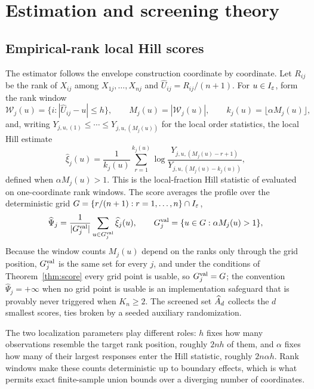 \section{Estimation and screening theory}\label{sec:estimation}

\subsection{Empirical-rank local Hill scores}

The estimator follows the envelope construction coordinate by coordinate.
Let $R_{ij}$ be the rank of $X_{ij}$ among $X_{1j},\ldots,X_{nj}$ and
$\widehat U_{ij}=R_{ij}/(n+1)$. For $u\in I_\varepsilon$, form the rank window
\[
 \mathcal W_j(u)=\{i:|\widehat U_{ij}-u|\le h\},\qquad
 M_j(u)=|\mathcal W_j(u)|,\qquad
 k_j(u)=\lfloor\alpha M_j(u)\rfloor,
\]
and, writing $Y_{j,u,(1)}\le\cdots\le Y_{j,u,(M_j(u))}$ for the local order
statistics, the local Hill estimate
\begin{equation}\label{eq:hill}
 \widehat\xi_j(u)=\frac1{k_j(u)}\sum_{r=1}^{k_j(u)}
 \log\frac{Y_{j,u,(M_j(u)-r+1)}}{Y_{j,u,(M_j(u)-k_j(u))}},
\end{equation}
defined when $\alpha M_j(u)>1$. This is the local-fraction Hill statistic of
\citet[Definition~5]{gardesPodgorny2025} evaluated on one-coordinate rank
windows. The score averages the profile over the deterministic grid
$G=\{r/(n+1):r=1,\ldots,n\}\cap I_\varepsilon$,
\begin{equation}\label{eq:emp-score}
 \widehat\Psi_j=\frac1{|G_j^{\rm val}|}\sum_{u\in G_j^{\rm val}}\widehat\xi_j(u),
 \qquad
 G_j^{\rm val}=\{u\in G:\alpha M_j(u)>1\},
\end{equation}
Because the window counts $M_j(u)$ depend on the ranks only through
the grid position, $G_j^{\rm val}$ is the same set for every $j$, and
under the conditions of Theorem~\ref{thm:score} every grid point is
usable, so $G_j^{\rm val}=G$; the convention $\widehat\Psi_j=+\infty$
when no grid point is usable is an implementation safeguard that is
provably never triggered when $K_n\ge2$. The screened set
$\widehat{A}_d$ collects the $d$ smallest scores, ties broken by a
seeded auxiliary randomization.

The two localization parameters play different roles: $h$ fixes how many
observations resemble the target rank position, roughly $2nh$ of them, and
$\alpha$ fixes how many of their largest responses enter the Hill statistic,
roughly $2n\alpha h$. Rank windows make these counts deterministic up to
boundary effects, which is what permits exact finite-sample union bounds
over a diverging number of coordinates.

